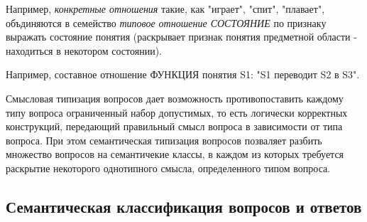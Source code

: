 Например, \textit{конкретные отношения} такие, как "играет", "спит", "плавает", объдиняются в семейство \textit{типовое отношение СОСТОЯНИЕ} по признаку выражать состояние понятия (раскрывает признак понятия предметной области - находиться в некотором состоянии).

\begin{SCn}
\end{SCn}

Например, составное отношение ФУНКЦИЯ понятия S1: "S1 переводит S2 в S3".

Смысловая типизация вопросов дает возможность противопоставить каждому типу вопроса ограниченный набор допустимых, то есть логически корректных конструкций, передающий правильный смысл вопроса в зависимости от типа вопроса. При этом семантическая типизация вопросов позваляет разбить множество вопросов на семантичекие классы, в каждом из которых требуется раскрытие некоторого однотипного смысла, определенного типом вопроса. 

\subsection{Семантическая классификация вопросов и ответов}
\label{chapter_questions_sec_sem_classification}

